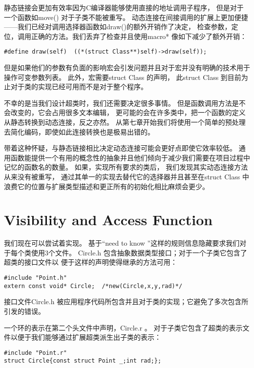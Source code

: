 静态链接会更加有效率因为C编译器能够使用直接的地址调用子程序，
但是对于一个函数如move() 对于子类不能被重写。
动态连接在间接调用的扩展上更加便捷——我们已经对调用选择器函数如draw()的额外开销作了决定，
检查参数，定位，调用正确的方法。我们丢弃了检查并且使用macro* 像如下减少了额外开销：
\begin{lstlisting}
#define draw(self)  ((*(struct Class**)self)->draw(self));
\end{lstlisting}

但是如果他们的参数有负面的影响宏会引发问题并且对于宏并没有明确的技术用于操作可变参数列表。
此外，宏需要struct Class 的声明，
此struct Class 到目前为止对于类的实现已经可用而不是对于整个程序。

不幸的是当我们设计超类时，我们还需要决定很多事情。
但是函数调用方法是不会改变的，它会占用很多文本编辑，
更可能的会在许多类中，把一个函数的定义从静态转换到动态连接，反之亦然。
从第七章开始我们将使用一个简单的预处理去简化编码，即使如此连接转换也是极易出错的。

带着这种怀疑，与静态链接相比决定动态连接可能会更好点即使它效率较低。
通用函数能提供一个有用的概念性的抽象并且他们倾向于减少我们需要在项目过程中记忆的函数名的数量。
如果，实现所有要求的类后，
我们发现其实动态连接方法从来没有被重写，
通过其单一的实现去替代它的选择器并且甚至在struct Class 
中浪费它的位置与扩展类型描述和更正所有的初始化相比麻烦会更少。

\section{Visibility and Access Function}
我们现在可以尝试着实现。
基于“need to know ”这样的规则信息隐藏要求我们对于每个类使用3个文件。
Circle.h 包含抽象数据类型接口；对于一个子类它包含了超类的接口文件以
便于这样的声明使得继承的方法可用：
\begin{lstlisting}
#include "Point.h"
extern const void* Circle;  /*new(Circle,x,y,rad)*/
\end{lstlisting}

接口文件Circle.h 被应用程序代码所包含并且对于类的实现；它避免了多次包含所引发的错误。

一个环的表示在第二个头文件中声明，Circle.r 。
对于子类它包含了超类的表示文件以便于我们能够通过扩展超类派生出子类的表示：
\begin{lstlisting}
#include "Point.r"
struct Circle{const struct Point _;int rad;};
\end{lstlisting}

